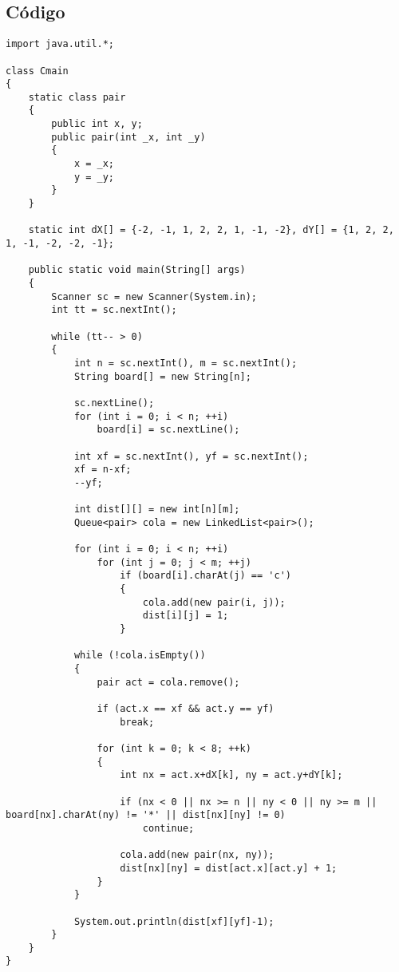 \subsection*{Código}
\begin{verbatim}
import java.util.*;
 
class Cmain
{
    static class pair
    {
        public int x, y;
        public pair(int _x, int _y)
        {
            x = _x;
            y = _y;
        }
    }
 
    static int dX[] = {-2, -1, 1, 2, 2, 1, -1, -2}, dY[] = {1, 2, 2, 1, -1, -2, -2, -1};
 
    public static void main(String[] args)
    {
        Scanner sc = new Scanner(System.in);
        int tt = sc.nextInt();
 
        while (tt-- > 0)
        {
            int n = sc.nextInt(), m = sc.nextInt();
            String board[] = new String[n];
 
            sc.nextLine();
            for (int i = 0; i < n; ++i)
                board[i] = sc.nextLine();
 
            int xf = sc.nextInt(), yf = sc.nextInt();
            xf = n-xf;
            --yf;
 
            int dist[][] = new int[n][m];
            Queue<pair> cola = new LinkedList<pair>();
 
            for (int i = 0; i < n; ++i)
                for (int j = 0; j < m; ++j)
                    if (board[i].charAt(j) == 'c')
                    {
                        cola.add(new pair(i, j));
                        dist[i][j] = 1;
                    }
 
            while (!cola.isEmpty())
            {
                pair act = cola.remove();
 
                if (act.x == xf && act.y == yf)
                    break;
 
                for (int k = 0; k < 8; ++k)
                {
                    int nx = act.x+dX[k], ny = act.y+dY[k];
 
                    if (nx < 0 || nx >= n || ny < 0 || ny >= m || board[nx].charAt(ny) != '*' || dist[nx][ny] != 0)
                        continue;
 
                    cola.add(new pair(nx, ny));
                    dist[nx][ny] = dist[act.x][act.y] + 1;
                }
            }
 
            System.out.println(dist[xf][yf]-1);
        }
    }
}
\end{verbatim}



